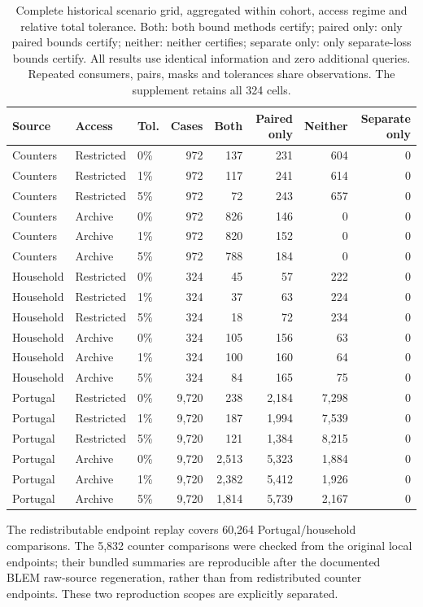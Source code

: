 \documentclass[12pt]{article}
\begin{document}
\begin{table}[htbp]
\centering\small\setlength{\tabcolsep}{4pt}
\caption{Complete historical scenario grid, aggregated within cohort, access
regime and relative total tolerance. Both: both bound methods certify;
paired only: only paired bounds certify; neither: neither certifies;
separate only: only separate-loss bounds certify. All results use identical
information and zero additional queries. Repeated consumers, pairs, masks
and tolerances share observations. The supplement retains all 324 cells.}
\label{tab:certificate-grid}
\begin{tabular}{lllrrrrr}
\toprule
Source & Access & Tol. & Cases & Both & Paired only & Neither & Separate only\\
\midrule
Counters & Restricted & 0\% & 972 & 137 & 231 & 604 & 0 \\
Counters & Restricted & 1\% & 972 & 117 & 241 & 614 & 0 \\
Counters & Restricted & 5\% & 972 & 72 & 243 & 657 & 0 \\
Counters & Archive & 0\% & 972 & 826 & 146 & 0 & 0 \\
Counters & Archive & 1\% & 972 & 820 & 152 & 0 & 0 \\
Counters & Archive & 5\% & 972 & 788 & 184 & 0 & 0 \\
Household & Restricted & 0\% & 324 & 45 & 57 & 222 & 0 \\
Household & Restricted & 1\% & 324 & 37 & 63 & 224 & 0 \\
Household & Restricted & 5\% & 324 & 18 & 72 & 234 & 0 \\
Household & Archive & 0\% & 324 & 105 & 156 & 63 & 0 \\
Household & Archive & 1\% & 324 & 100 & 160 & 64 & 0 \\
Household & Archive & 5\% & 324 & 84 & 165 & 75 & 0 \\
Portugal & Restricted & 0\% & 9,720 & 238 & 2,184 & 7,298 & 0 \\
Portugal & Restricted & 1\% & 9,720 & 187 & 1,994 & 7,539 & 0 \\
Portugal & Restricted & 5\% & 9,720 & 121 & 1,384 & 8,215 & 0 \\
Portugal & Archive & 0\% & 9,720 & 2,513 & 5,323 & 1,884 & 0 \\
Portugal & Archive & 1\% & 9,720 & 2,382 & 5,412 & 1,926 & 0 \\
Portugal & Archive & 5\% & 9,720 & 1,814 & 5,739 & 2,167 & 0 \\
\bottomrule
\end{tabular}
\end{table}
\FloatBarrier
The redistributable endpoint replay covers 60,264 Portugal/household
comparisons. The 5,832 counter comparisons were checked from the original
local endpoints; their bundled summaries are reproducible after the
documented BLEM raw-source regeneration, rather than from redistributed
counter endpoints. These two reproduction scopes are explicitly separated.
\end{document}
